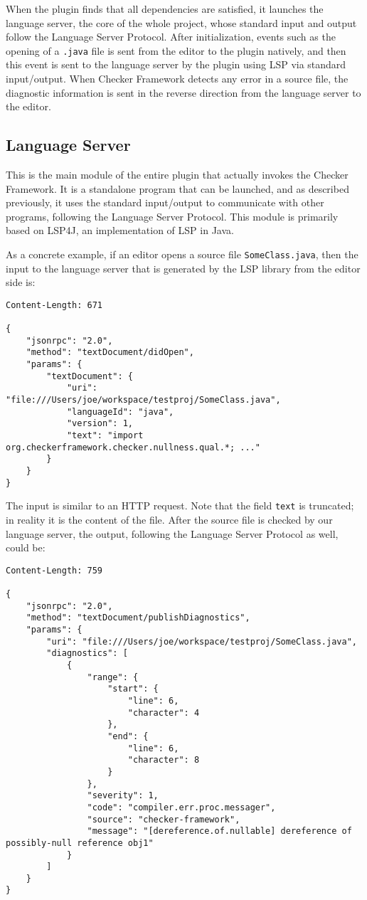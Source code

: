 \documentclass{article}
\begin{document}
When the plugin finds that all dependencies are satisfied, it launches the
language server, the core of the whole project, whose standard input and output
follow the Language Server Protocol. After initialization, events such as the
opening of a \verb|.java| file is sent from the editor to the plugin natively,
and then this event is sent to the language server by the plugin using LSP via
standard input/output. When Checker Framework detects any error in a source
file, the diagnostic information is sent in the reverse direction from the
language server to the editor.

\subsection{Language Server}

This is the main module of the entire plugin that actually invokes the Checker
Framework. It is a standalone program that can be launched, and as described
previously, it uses the standard input/output to communicate with other
programs, following the Language Server Protocol. This module is primarily based
on LSP4J\cite{lsp4j}, an implementation of LSP in Java.

As a concrete example, if an editor opens a source file \verb|SomeClass.java|,
then the input to the language server that is generated by the LSP library from
the editor side is:

\begin{lstlisting}
Content-Length: 671

{
    "jsonrpc": "2.0",
    "method": "textDocument/didOpen",
    "params": {
        "textDocument": {
            "uri": "file:///Users/joe/workspace/testproj/SomeClass.java",
            "languageId": "java",
            "version": 1,
            "text": "import org.checkerframework.checker.nullness.qual.*; ..."
        }
    }
}
\end{lstlisting}

The input is similar to an HTTP request. Note that the field \verb|text| is
truncated; in reality it is the content of the file. After the source file is
checked by our language server, the output, following the Language Server
Protocol as well, could be:

\begin{lstlisting}
Content-Length: 759

{
    "jsonrpc": "2.0",
    "method": "textDocument/publishDiagnostics",
    "params": {
        "uri": "file:///Users/joe/workspace/testproj/SomeClass.java",
        "diagnostics": [
            {
                "range": {
                    "start": {
                        "line": 6,
                        "character": 4
                    },
                    "end": {
                        "line": 6,
                        "character": 8
                    }
                },
                "severity": 1,
                "code": "compiler.err.proc.messager",
                "source": "checker-framework",
                "message": "[dereference.of.nullable] dereference of possibly-null reference obj1"
            }
        ]
    }
}
\end{lstlisting}
\end{document}
